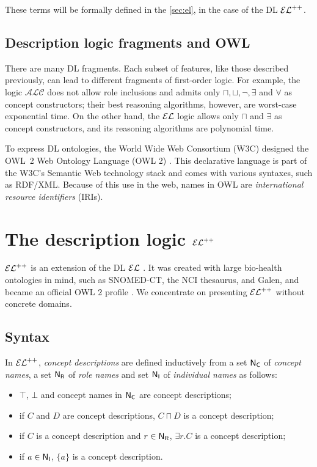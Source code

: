 These terms will be formally defined in the \autoref{sec:el}, in the case of the DL $\mathcal{EL}^{++}$.

\subsection{Description logic fragments and OWL}

There are many DL fragments. Each subset of features, like those described previously, can lead to different fragments of first-order logic. For example, the logic $\mathcal{ALC}$ does not allow role inclusions and admits only $\sqcap, \sqcup, \lnot, \exists$ and $\forall$ as concept constructors; their best reasoning algorithms, however, are worst-case exponential time. On the other hand, the $\mathcal{EL}$ logic allows only $\sqcap$ and $\exists$ as concept constructors, and its reasoning algorithms are polynomial time.

To express DL ontologies, the World Wide Web Consortium (W3C) designed the OWL~2 Web Ontology Language (OWL 2) \citep{owl2}. This declarative language is part of the W3C's Semantic Web technology stack and comes with various syntaxes, such as RDF/XML. Because of this use in the web, names in OWL are \emph{international resource identifiers} (IRIs).

\section{The description logic \texorpdfstring{$\mathcal{EL}^{++}$}{𝓔𝓛++}}
\label{sec:el}

$\mathcal{EL}^{++}$ is an extension of the DL $\mathcal{EL}$ \citep{Baader2005a}. It was created with large bio-health ontologies in mind, such as SNOMED-CT, the NCI thesaurus, and Galen, and became an official OWL 2 profile \citep{owl2}. We concentrate on presenting $\mathcal{EL}^{++}$ without concrete domains.

\subsection{Syntax}
In $\mathcal{EL}^{++}$, \emph{concept descriptions} are defined inductively from a set $\mathsf{N_C}$ of \emph{concept names}, a set $\mathsf{N_R}$ of \emph{role names} and set $\mathsf{N_I}$ of \emph{individual names} as follows:
\begin{itemize}
	\item $\top$, $\bot$ and concept names in $\mathsf{N_C}$ are concept descriptions;
	\item if $C$ and $D$ are concept descriptions, $C \sqcap D$ is a concept description;
	\item if $C$ is a concept description and $r \in \mathsf{N_R}$, $\exists r.C$ is a concept description;
	\item if $a \in \mathsf{N_I}$, $\{a\}$ is a concept description.
\end{itemize}

